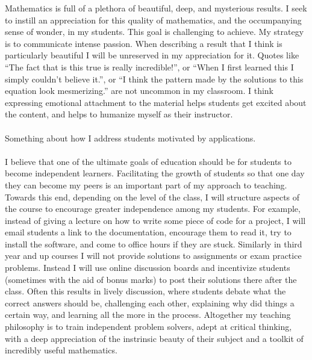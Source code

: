 \documentclass{article}
\begin{document}
Mathematics is full of a plethora of beautiful, deep, and mysterious results. I seek to instill an appreciation for this quality of mathematics, and the occumpanying sense of wonder, in my students. This goal is challenging to achieve. My strategy is to communicate intense passion. When describing a result that I think is particularly beautiful I will be unreserved in my appreciation for it. Quotes like ``The fact that is this true is really incredible!'', or  ``When I first learned this I simply couldn't believe it.'', or ``I think the pattern made by the solutions to this equation look mesmerizing.'' are not uncommon in my classroom. I think expressing emotional attachment to the material helps students get excited about the content, and helps to humanize myself as their instructor.

\paragraph{}
Something about how I address students motivated by applications.
\paragraph{}
I believe that one of the ultimate goals of education should be for students to become independent learners. Facilitating the growth of students so that one day they can become my peers is an important part of my approach to teaching. Towards this end, depending on the level of the class, I will structure aspects of the course to encourage greater independence among my students. For example, instead of giving a lecture on how to write some piece of code for a project, I will email students a link to the documentation, encourage them to read it, try to install the software, and come to office hours if they are stuck. Similarly in third year and up courses I will not provide solutions to assignments or exam practice problems. Instead I will use online discussion boards and incentivize students (sometimes with the aid of bonus marks) to post their solutions there after the class. Often this results in lively discussion, where students debate what the correct answers should be, challenging each other, explaining why did things a certain way, and learning all the more in the process. Altogether my teaching philosophy is to train independent problem solvers, adept at critical thinking, with a deep appreciation of the instrinsic beauty of their subject and a toolkit of incredibly useful mathematics.
\end{document}
